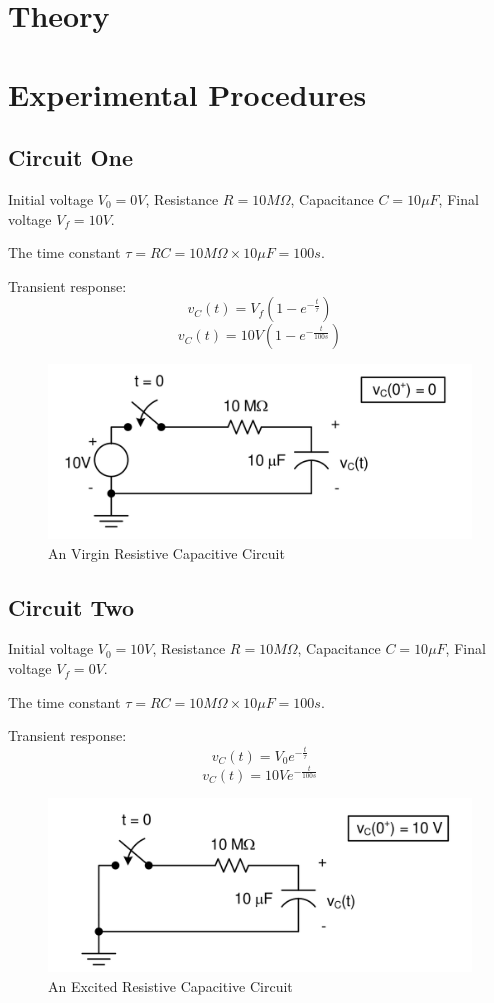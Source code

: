 \documentclass[12pt]{article}
\begin{document}
\section{Theory}
\section{Experimental Procedures}
\subsection{Circuit One}
Initial voltage $V_0 = 0V$, Resistance $R = 10M\Omega$, Capacitance $C = 10\mu F$, Final voltage $V_f = 10V$.

The time constant $\tau = RC = 10M\Omega \times 10\mu F = 100s$.

Transient response:
\[
	v_C(t) = V_f (1 - e^{-\frac{t}{\tau}})
\]
\[
	v_C(t) = 10V (1 - e^{-\frac{t}{100s}})
\]
\begin{figure}[H]
	\centering
	\includegraphics[width=14cm]{e5_1}
	\caption{An Virgin Resistive Capacitive Circuit}
\end{figure}
\subsection{Circuit Two}
Initial voltage $V_0 = 10V$, Resistance $R = 10M\Omega$, Capacitance $C = 10\mu F$, Final voltage $V_f = 0V$.

The time constant $\tau = RC = 10M\Omega \times 10\mu F = 100s$.

Transient response:
\[
	v_C(t) = V_0 e^{-\frac{t}{\tau}}
\]
\[
	v_C(t) = 10V e^{-\frac{t}{100s}}
\]
\begin{figure}[H]
	\centering
	\includegraphics[width=14cm]{e5_2}
	\caption{An Excited Resistive Capacitive Circuit}
\end{figure}
\end{document}
